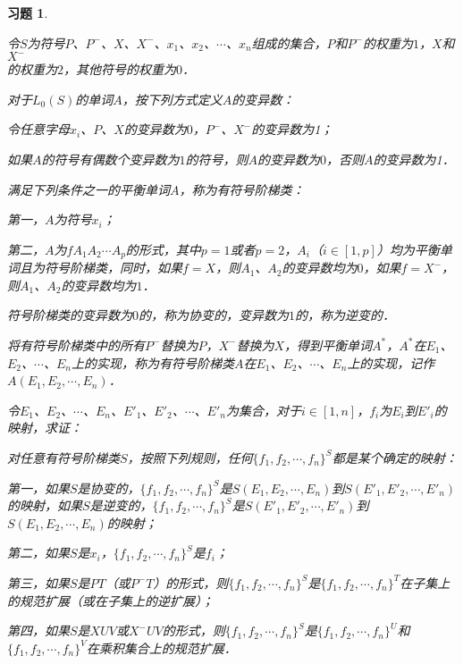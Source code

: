 \documentclass[12pt, a4paper, oneside]{book}
\newtheorem{exer}{习题}
\begin{document}
			\begin{exer}\label{exer199}
				\hfill\par
				令$S$为符号$P$、$P^-$、$X$、$X^-$、$x_1$、$x_2$、$\cdots$、$x_n$组成的集合，$P$和$P^-$的权重为$1$，$X$和$X^-$\\的权重为$2$，其他符号的权重为$0$．
				\par
				对于$L_0(S)$的单词$A$，按下列方式定义$A$的变异数：
				\par
				令任意字母$x_i$、$P$、$X$的变异数为$0$，$P^-$、$X^-$的变异数为1；
				\par
				如果$A$的符号有偶数个变异数为$1$的符号，则$A$的变异数为$0$，否则$A$的变异数为1．
				\par
				满足下列条件之一的平衡单词$A$，称为有符号阶梯类：
				\par
				第一，$A$为符号$x_i$；
				\par
				第二，$A$为$fA_1A_2\cdots A_p$的形式，其中$p=1$或者$p=2$，$A_i$（$i\in [1, p]$）均为平衡单词且为符号阶梯类，同时，如果$f=X$，则$A_1$、$A_2$的变异数均为$0$，如果$f=X^-$，则$A_1$、$A_2$的变异数均为$1$．
				\par
				符号阶梯类的变异数为$0$的，称为协变的，变异数为$1$的，称为逆变的．
				\par
				将有符号阶梯类中的所有$P^-$替换为$P$，$X^-$替换为$X$，得到平衡单词$A^*$，$A^*$在$E_1$、$E_2$、$\cdots$、$E_n$上的实现，称为有符号阶梯类$A$在$E_1$、$E_2$、$\cdots$、$E_n$上的实现，记作\\$A(E_1, E_2, \cdots, E_n)$．
				\par
				令$E_1$、$E_2$、$\cdots$、$E_n$、${E'}_1$、${E'}_2$、$\cdots$、${E'}_n$为集合，对于$i\in [1, n]$，$f_i$为$E_i$到${E'}_i$的映射，求证：
				\par
				对任意有符号阶梯类$S$，按照下列规则，任何$\{f_1, f_2, \cdots, f_n\}^S$都是某个确定的映射：
				\par
				第一，如果$S$是协变的，$\{f_1, f_2, \cdots, f_n\}^S$是$S(E_1, E_2, \cdots, E_n)$到$S({E'}_1, {E'}_2, \cdots, {E'}_n)$的映射，如果$S$是逆变的，$\{f_1, f_2, \cdots, f_n\}^S$是$S({E'}_1, {E'}_2, \cdots, {E'}_n)$到$S(E_1, E_2, \cdots, E_n)$的映射；
				\par
				第二，如果$S$是$x_i$，$\{f_1, f_2, \cdots, f_n\}^S$是$f_i$；
				\par
				第三，如果$S$是$PT$（或$P^-T$）的形式，则$\{f_1, f_2, \cdots, f_n\}^S$是$\{f_1, f_2, \cdots, f_n\}^T$在子集上的规范扩展（或在子集上的逆扩展）；
				\par
				第四，如果$S$是$XUV$或$X^-UV$的形式，则$\{f_1, f_2, \cdots, f_n\}^S$是$\{f_1, f_2, \cdots, f_n\}^U$和\\$\{f_1, f_2, \cdots, f_n\}^V$在乘积集合上的规范扩展．

\end{exer}
\end{document}
